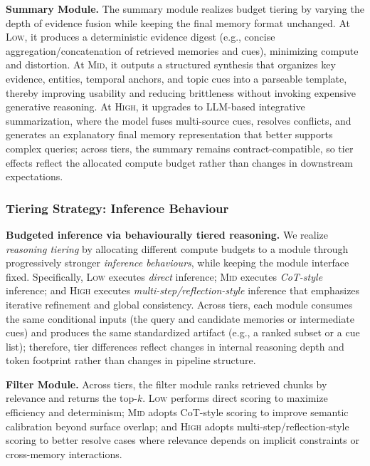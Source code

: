 \textbf{Summary Module.}
The summary module realizes budget tiering by varying the depth of evidence fusion while keeping the final memory format unchanged. At \textsc{Low}, it produces a deterministic evidence digest (e.g., concise aggregation/concatenation of retrieved memories and cues), minimizing compute and distortion. At \textsc{Mid}, it outputs a structured synthesis that organizes key evidence, entities, temporal anchors, and topic cues into a parseable template, thereby improving usability and reducing brittleness without invoking expensive generative reasoning. At \textsc{High}, it upgrades to LLM-based integrative summarization, where the model fuses multi-source cues, resolves conflicts, and generates an explanatory final memory representation that better supports complex queries; across tiers, the summary remains contract-compatible, so tier effects reflect the allocated compute budget rather than changes in downstream expectations.

\subsubsection{Tiering Strategy: Inference Behaviour}

\textbf{Budgeted inference via behaviourally tiered reasoning.}
We realize \emph{reasoning tiering} by allocating different compute budgets to a module through progressively stronger \emph{inference behaviours}, while keeping the module interface fixed. Specifically, \textsc{Low} executes \emph{direct} inference; \textsc{Mid} executes \emph{CoT-style} inference; and \textsc{High} executes \emph{multi-step/reflection-style} inference that emphasizes iterative refinement and global consistency. Across tiers, each module consumes the same conditional inputs (the query and candidate memories or intermediate cues) and produces the same standardized artifact (e.g., a ranked subset or a cue list); therefore, tier differences reflect changes in internal reasoning depth and token footprint rather than changes in pipeline structure.

\textbf{Filter Module.}
Across tiers, the filter module ranks retrieved chunks by relevance and returns the top-$k$. \textsc{Low} performs direct scoring to maximize efficiency and determinism; \textsc{Mid} adopts CoT-style scoring to improve semantic calibration beyond surface overlap; and \textsc{High} adopts multi-step/reflection-style scoring to better resolve cases where relevance depends on implicit constraints or cross-memory interactions.

